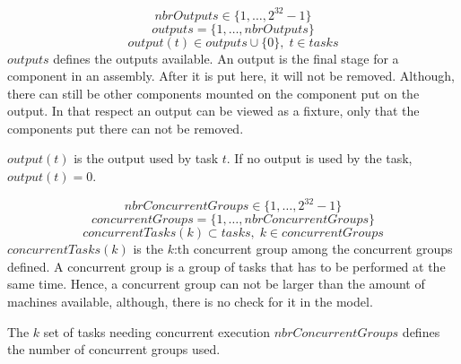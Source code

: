  \begin{equation}\label{eq:7}
 nbrOutputs \in \{1 , \ldots , 2^{32}-1\}
 \end{equation}
 \begin{equation}\label{eq:16}
 outputs = \{1 , \ldots , nbrOutputs\}
 \end{equation}
 \begin{equation}\label{eq:23}
 output(t) \in outputs \cup \{0\}, \; t \in tasks
 \end{equation}
 $outputs$ defines the outputs available. An output is the final stage for a component in an assembly. After it is put here, it will not be removed. Although, there can still be other components mounted on the component put on the output. In that respect an output can be viewed as a fixture, only that the components put there can not be removed.
 
 $output(t)$ is the output used by task $t$. If no output is used by the task, $output(t) = 0$.
 
 
 \begin{equation}\label{eq:8}
 nbrConcurrentGroups \in \{1 , \ldots , 2^{32}-1\}
 \end{equation}
 \begin{equation}\label{eq:17}
 concurrentGroups = \{1 , \ldots , nbrConcurrentGroups\}
 \end{equation}
 \begin{equation}\label{eq:30}
 concurrentTasks(k) \subset tasks, \; k \in concurrentGroups
 \end{equation}
 $concurrentTasks(k)$ is the $k$:th concurrent group among the concurrent groups defined. A concurrent group is a group of tasks that has to be performed at the same time. Hence, a concurrent group can not be larger than the amount of machines available, although, there is no check for it in the model. 
 
 The $k$ set of tasks needing concurrent execution
 $nbrConcurrentGroups$ defines the number of concurrent groups used. 
 
